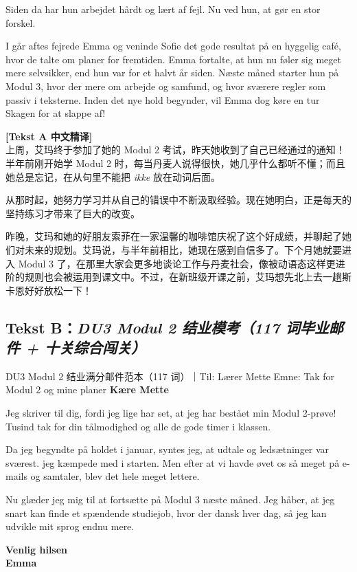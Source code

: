 Siden da har hun arbejdet hårdt og lært af  fejl. Nu ved hun, at  gør en stor forskel.

I går aftes fejrede Emma og  veninde Sofie det gode resultat på en hyggelig café, hvor de talte om  planer for fremtiden. Emma fortalte, at hun nu føler sig meget mere selvsikker, end hun var for et halvt år siden. Næste måned starter hun på Modul 3, hvor der  mere om arbejde og samfund, og hvor sværere regler som passiv  i teksterne. Inden det nye hold begynder, vil Emma dog køre en tur  Skagen for at slappe af!

\begin{transbox}
\small
\textbf{\color{NCDTeal}[Tekst A 中文精译]}\\
上周，艾玛终于参加了她的 Modul 2 考试，昨天她收到了自己已经通过的通知！半年前刚开始学 Modul 2 时，每当丹麦人说得很快，她几乎什么都听不懂；而且她总是忘记，在从句里不能把 \textit{ikke} 放在动词后面。

从那时起，她努力学习并从自己的错误中不断汲取经验。现在她明白，正是每天的坚持练习才带来了巨大的改变。

昨晚，艾玛和她的好朋友索菲在一家温馨的咖啡馆庆祝了这个好成绩，并聊起了她们对未来的规划。艾玛说，与半年前相比，她现在感到自信多了。下个月她就要进入 Modul 3 了，在那里大家会更多地谈论工作与丹麦社会，像被动语态这样更进阶的规则也会被运用到课文中。不过，在新班级开课之前，艾玛想先北上去一趟斯卡恩好好放松一下！
\end{transbox}

\subsection*{Tekst B：\textit{DU3 Modul 2 结业模考（117 词毕业邮件 + 十关综合闯关）}}

\begin{emailbox}{DU3 Modul 2 结业满分邮件范本（117 词）｜Til: Lærer Mette \quad Emne: Tak for Modul 2 og mine planer}
\textbf{Kære Mette}

Jeg skriver til dig, fordi jeg lige har set, at jeg har bestået min Modul 2-prøve! Tusind tak for din tålmodighed og alle de gode timer i klassen.

Da jeg begyndte på holdet i januar, syntes jeg, at udtale og ledsætninger var sværest.  jeg kæmpede med i starten. Men efter at vi havde øvet os så meget på e-mails og samtaler, blev det hele meget lettere.

Nu glæder jeg mig til at fortsætte på Modul 3 næste måned. Jeg håber, at jeg snart kan finde et spændende studiejob, hvor der  dansk hver dag, så jeg kan udvikle mit sprog endnu mere.

\textbf{Venlig hilsen}\\
\textbf{Emma}
\end{emailbox}

